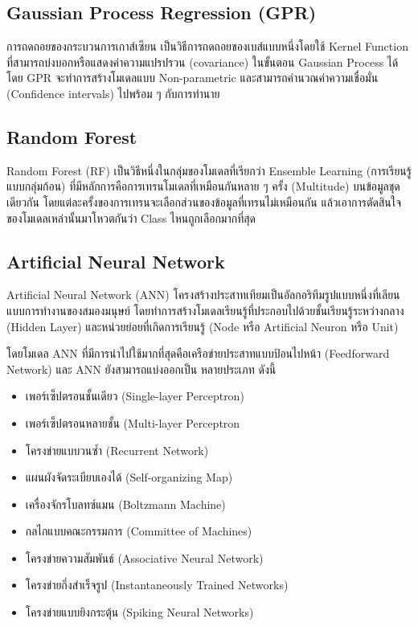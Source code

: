 \subsection{Gaussian Process Regression (GPR)}

การถดถอยของกระบวนการเกาส์เซียน เป็นวิธีการถดถอยของเบส์แบบหนึ่งโดยใช้ Kernel Function ที่สามารถบ่งบอกหรือแสดงค่าความแปรปรวน (covariance) 
ในขั้นตอน Gaussian Process ได้\cite{rasmussen2005} โดย GPR จะทำการสร้างโมเดลแบบ Non-parametric และสามารถคำนวณค่าความเชื่อมั่น 
(Confidence intervals) ไปพร้อม ๆ กับการทำนาย

\subsection{Random Forest}

Random Forest (RF) เป็นวิธีหนึ่งในกลุ่มของโมเดลที่เรียกว่า Ensemble Learning (การเรียนรู้แบบกลุ่มก้อน) 
ที่มีหลักการคือการเทรนโมเดลที่เหมือนกันหลาย ๆ ครั้ง (Multitude) บนข้อมูลชุดเดียวกัน โดยแต่ละครั้งของการเทรนจะเลือกส่วนของข้อมูลที่เทรนไม่เหมือนกัน 
แล้วเอาการตัดสินใจของโมเดลเหล่านั้นมาโหวตกันว่า Class ไหนถูกเลือกมากที่สุด\cite{breiman2001,quinlan1986}

\subsection{Artificial Neural Network}

Artificial Neural Network (ANN) โครงสร้างประสาทเทียมเป็นอัลกอริทึมรูปแบบหนึ่งที่เลียนแบบการทำงานของสมองมนุษย์
โดยทำการสร้างโมเดลเรียนรู้ที่ประกอบไปด้วยชั้นเรียนรู้ระหว่างกลาง (Hidden Layer) และหน่วยย่อยที่เกิดการเรียนรู้ (Node หรือ Artificial Neuron หรือ Unit)

โดยโมเดล ANN ที่มีการนำไปใช้มากที่สุดคือเครือข่ายประสาทแบบป้อนไปหน้า (Feedforward Network) และ ANN ยังสามารถแบ่งออกเป็น
หลายประเภท ดังนี้

\begin{itemize}
    \item เพอร์เซ็ปตรอนชั้นเดียว (Single-layer Perceptron)
    \item เพอร์เซ็ปตรอนหลายชั้น (Multi-layer Perceptron
    \item โครงข่ายแบบวนซ้ำ (Recurrent Network)
    \item แผนผังจัดระเบียบเองได้ (Self-organizing Map)
    \item เครื่องจักรโบลทซ์แมน (Boltzmann Machine)
    \item กลไกแบบคณะกรรมการ (Committee of Machines)
    \item โครงข่ายความสัมพันธ์ (Associative Neural Network)
    \item โครงข่ายกึ่งสำเร็จรูป (Instantaneously Trained Networks)
    \item โครงข่ายแบบยิงกระตุ้น (Spiking Neural Networks) 
\end{itemize}
